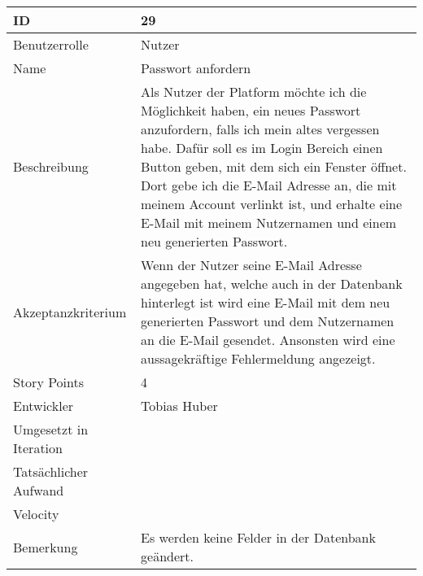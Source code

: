 \begin{tabularx}{\textwidth}{|p{}|X|}
	\hline
	ID & 29 \\
	\hline
	Benutzerrolle & Nutzer \\
	\hline
	Name & Passwort anfordern\\
	\hline
	Beschreibung & Als Nutzer der Platform möchte ich die Möglichkeit haben, ein neues Passwort anzufordern, falls ich mein altes vergessen habe. Dafür soll es im Login Bereich einen Button geben, mit dem sich ein Fenster öffnet. Dort gebe ich die E-Mail Adresse an, die mit meinem Account verlinkt ist, und erhalte eine E-Mail mit meinem Nutzernamen und einem neu generierten Passwort. \\
	\hline
	Akzeptanzkriterium & Wenn der Nutzer seine E-Mail Adresse angegeben hat, welche auch in der Datenbank hinterlegt ist wird eine E-Mail mit dem neu generierten Passwort und dem Nutzernamen an die E-Mail gesendet. Ansonsten wird eine aussagekräftige Fehlermeldung angezeigt. \\
	\hline
	Story Points & 4\\
	\hline
	Entwickler & Tobias Huber\\
	\hline
	Umgesetzt in Iteration & \\
	\hline
	Tatsächlicher Aufwand & \\
	\hline
	Velocity & \\
	\hline
	Bemerkung & Es werden keine Felder in der Datenbank geändert.\\
	\hline
\end{tabularx}
\vspace{20pt}
